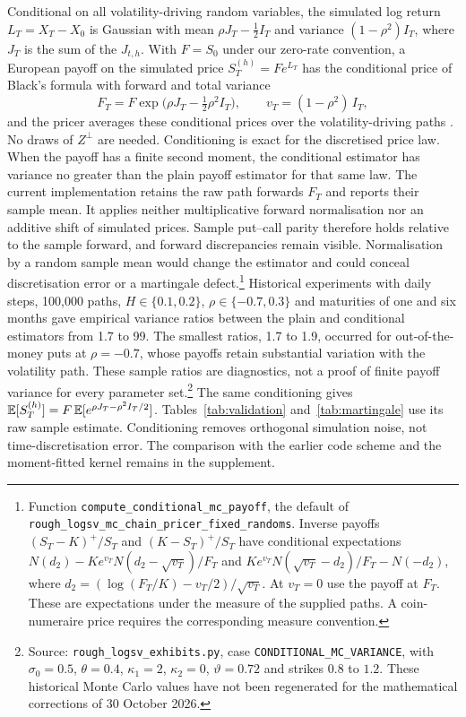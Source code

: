 Conditional on all volatility-driving random variables, the simulated log return $L_T=X_T-X_0$ is Gaussian with mean $\rho J_T-\tfrac12I_T$ and variance $(1-\rho^2)I_T$, where $J_T$ is the sum of the $J_{t,h}$. With $F=S_0$ under our zero-rate convention, a European payoff on the simulated price $S_T^{(h)}=F e^{L_T}$ has the conditional price of Black's formula with forward and total variance
\begin{equation}\label{eq:conditional_forward}
F_T=F\exp\big(\rho J_T-\tfrac12\rho^2I_T\big),\qquad v_T=(1-\rho^2)\,I_T,
\end{equation}
and the pricer averages these conditional prices over the volatility-driving paths \citep{Willard1997,RomanoTouzi1997}. No draws of $Z^\perp$ are needed. Conditioning is exact for the discretised price law. When the payoff has a finite second moment, the conditional estimator has variance no greater than the plain payoff estimator for that same law. The current implementation retains the raw path forwards $F_T$ and reports their sample mean. It applies neither multiplicative forward normalisation nor an additive shift of simulated prices. Sample put--call parity therefore holds relative to the sample forward, and forward discrepancies remain visible. Normalisation by a random sample mean would change the estimator and could conceal discretisation error or a martingale defect.\footnote{Function \texttt{compute\_conditional\_mc\_payoff}, the default of \texttt{rough\_logsv\_mc\_chain\_pricer\_fixed\_randoms}. Inverse payoffs $(S_T-K)^+/S_T$ and $(K-S_T)^+/S_T$ have conditional expectations $N(d_2)-Ke^{v_T}N(d_2-\sqrt{v_T})/F_T$ and $Ke^{v_T}N(\sqrt{v_T}-d_2)/F_T-N(-d_2)$, where $d_2=(\log(F_T/K)-v_T/2)/\sqrt{v_T}$. At $v_T=0$ use the payoff at $F_T$. These are expectations under the measure of the supplied paths. A coin-numeraire price requires the corresponding measure convention.} Historical experiments with daily steps, 100{,}000 paths, $H\in\{0.1,0.2\}$, $\rho\in\{-0.7,0.3\}$ and maturities of one and six months gave empirical variance ratios between the plain and conditional estimators from 1.7 to 99. The smallest ratios, 1.7 to 1.9, occurred for out-of-the-money puts at $\rho=-0.7$, whose payoffs retain substantial variation with the volatility path. These sample ratios are diagnostics, not a proof of finite payoff variance for every parameter set.\footnote{Source: \texttt{rough\_logsv\_exhibits.py}, case \texttt{CONDITIONAL\_MC\_VARIANCE}, with $\sigma_0=0.5$, $\theta=0.4$, $\kappa_1=2$, $\kappa_2=0$, $\vartheta=0.72$ and strikes $0.8$ to $1.2$. These historical Monte Carlo values have not been regenerated for the mathematical corrections of 30 October 2026.} The same conditioning gives $\mathbb{E}[S_T^{(h)}]=F\,\mathbb{E}[e^{\rho J_T-\rho^2I_T/2}]$. Tables~\ref{tab:validation} and~\ref{tab:martingale} use its raw sample estimate. Conditioning removes orthogonal simulation noise, not time-discretisation error. The comparison with the earlier code scheme and the moment-fitted kernel remains in the supplement.

